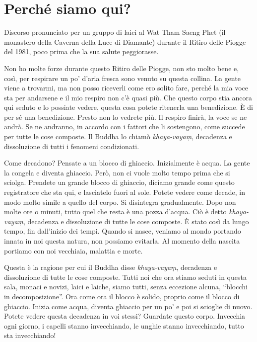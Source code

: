 \chapter{Perché siamo qui?}

\begin{openingQuote}
  \centering

  Discorso pronunciato per un gruppo di laici al Wat Tham Saeng Phet (il
  monastero della Caverna della Luce di Diamante) durante il Ritiro delle Piogge
  del 1981, poco prima che la sua salute peggiorasse.
\end{openingQuote}

Non ho molte forze durante questo Ritiro delle Piogge, non sto molto
bene e, così, per respirare un po' d'aria fresca sono venuto su questa
collina. La gente viene a trovarmi, ma non posso riceverli come ero
solito fare, perché la mia voce sta per andarsene e il mio respiro non
c'è quasi più. Che questo corpo stia ancora qui seduto e lo possiate
vedere, questa cosa potete ritenerla una benedizione. È di per sé una
benedizione. Presto non lo vedrete più. Il respiro finirà, la voce se ne
andrà. Se ne andranno, in accordo con i fattori che li sostengono, come
succede per tutte le cose composte. Il Buddha lo chiamò
\emph{khaya-vayaṃ}, decadenza e dissoluzione di tutti i fenomeni
condizionati.

Come decadono? Pensate a un blocco di ghiaccio. Inizialmente è acqua. La
gente la congela e diventa ghiaccio. Però, non ci vuole molto tempo
prima che si sciolga. Prendete un grande blocco di ghiaccio, diciamo
grande come questo registratore che sta qui, e lasciatelo fuori al sole.
Potete vedere come decade, in modo molto simile a quello del corpo. Si
disintegra gradualmente. Dopo non molte ore o minuti, tutto quel che
resta è una pozza d'acqua. Ciò è detto \emph{khaya-vayaṃ}, decadenza e
dissoluzione di tutte le cose composte. È stato così da lungo tempo, fin
dall'inizio dei tempi. Quando si nasce, veniamo al mondo portando innata
in noi questa natura, non possiamo evitarla. Al momento della nascita
portiamo con noi vecchiaia, malattia e morte.

Questa è la ragione per cui il Buddha disse \emph{khaya-vayaṃ},
decadenza e dissoluzione di tutte le cose composte. Tutti noi che ora
stiamo seduti in questa sala, monaci e novizi, laici e laiche, siamo
tutti, senza eccezione alcuna, ``blocchi in decomposizione''. Ora come
ora il blocco è solido, proprio come il blocco di ghiaccio. Inizia come
acqua, diventa ghiaccio per un po' e poi si scioglie di nuovo. Potete
vedere questa decadenza in voi stessi? Guardate questo corpo. Invecchia
ogni giorno, i capelli stanno invecchiando, le unghie stanno
invecchiando, tutto sta invecchiando!

